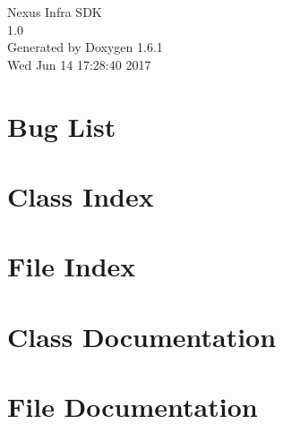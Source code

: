 \documentclass[a4paper]{book}
\begin{document}
\hypersetup{pageanchor=false}
\begin{titlepage}
\vspace*{7cm}
\begin{center}
{\Large Nexus Infra SDK \\[1ex]\large 1.0 }\\
\vspace*{1cm}
{\large Generated by Doxygen 1.6.1}\\
\vspace*{0.5cm}
{\small Wed Jun 14 17:28:40 2017}\\
\end{center}
\end{titlepage}
\clearemptydoublepage
{}
\tableofcontents
\clearemptydoublepage
{}
\hypersetup{pageanchor=true}
\chapter{Bug List}
\label{bug}
\hypertarget{bug}{}

\chapter{Class Index}

\chapter{File Index}

\chapter{Class Documentation}








\chapter{File Documentation}


\printindex
\end{document}

